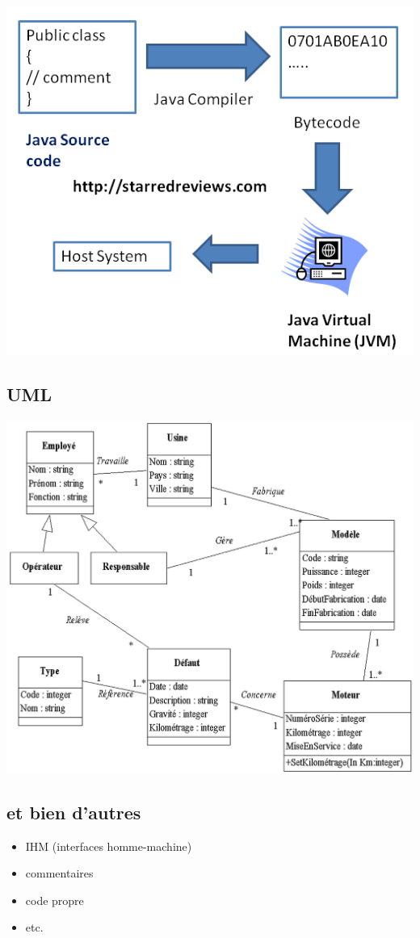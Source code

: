 \documentclass[french]{beamer}%
\begin{document}
			\begin{frame}
				\begin{center}
					\includegraphics[scale=0.5]{JVM}
				\end{center}
			\end{frame}
	
		\subsection{UML}
		
			\begin{frame}
				\begin{center}
					\includegraphics[scale=0.13]{UML}
				\end{center}
			\end{frame}
	
		\subsection{et bien d'autres}
	
			\begin{frame}
				\begin{itemize}
					\item IHM (interfaces homme-machine)
					\item commentaires
					\item code propre
					\item etc.
				\end{itemize}
			\end{frame}
	
\end{document}
